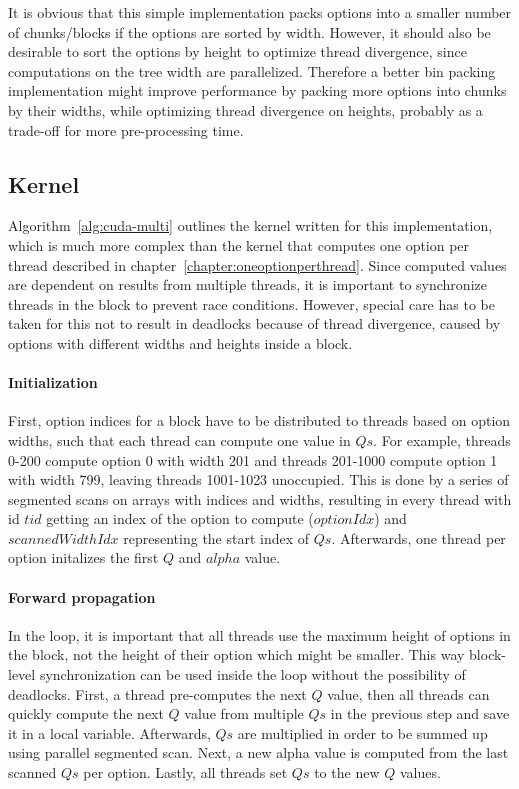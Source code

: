 It is obvious that this simple implementation packs options into a smaller number of chunks/blocks if the options are sorted by width. However, it should also be desirable to sort the options by height to optimize thread divergence, since computations on the tree width are parallelized. Therefore a better bin packing implementation might improve performance by packing more options into chunks by their widths, while optimizing thread divergence on heights, probably as a trade-off for more pre-processing time.

\subsection*{Kernel}
Algorithm~\ref{alg:cuda-multi} outlines the kernel written for this implementation, which is much more complex than the kernel that computes one option per thread described in chapter~\ref{chapter:oneoptionperthread}. Since computed values are dependent on results from multiple threads, it is important to synchronize threads in the block to prevent race conditions. However, special care has to be taken for this not to result in deadlocks because of thread divergence, caused by options with different widths and heights inside a block. 

\paragraph{Initialization}
First, option indices for a block have to be distributed to threads based on option widths, such that each thread can compute one value in $\mathit{Qs}$. For example, threads 0-200 compute option 0 with width 201 and threads 201-1000 compute option 1 with width 799, leaving threads 1001-1023 unoccupied. This is done by a series of segmented scans on arrays with indices and widths, resulting in every thread with id $\mathit{tid}$ getting an index of the option to compute ($\mathit{optionIdx}$) and $\mathit{scannedWidthIdx}$ representing the start index of $\mathit{Qs}$. Afterwards, one thread per option initalizes the first $Q$ and $\mathit{alpha}$ value.

\paragraph{Forward propagation}
In the loop, it is important that all threads use the maximum height of options in the block, not the height of their option which might be smaller. This way block-level synchronization can be used inside the loop without the possibility of deadlocks. First, a thread pre-computes the next $Q$ value, then all threads can quickly compute the next $Q$ value from multiple $\mathit{Qs}$ in the previous step and save it in a local variable. Afterwards, $\mathit{Qs}$ are multiplied in order to be summed up using parallel segmented scan. Next, a new alpha value is computed from the last scanned $Qs$ per option. Lastly, all threads set $\mathit{Qs}$ to the new $Q$ values.

